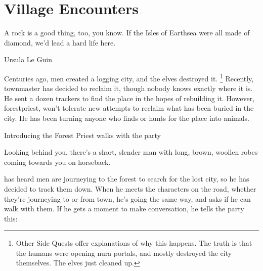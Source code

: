 \section{Village Encounters}


\epigraph{A rock is a good thing, too, you know. If the Isles of Earthsea were all made of diamond, we'd lead a hard life here.}{Ursula Le Guin}

\renewcommand{\sqarea}{Villages}

\setcounter{encnum}{1}
\renewcommand{\encsymbol}{\ding{170}}

\begin{multicols}{2}

\resumecontents[Town]
\resumecontents[Forest]

\label{herenofarther}

\stopcontents[Town]
\stopcontents[Forest]

\startcontents[sq]

\sqminitoc

\noindent
Centuries ago, men created a logging city, and the elves destroyed it.%
\footnote{Other Side Quests offer explanations of why this happens.
The truth is that the humans were opening nura portals, and mostly destroyed the city themselves.
The elves just cleaned up.} 
Recently, \gls{townmaster} has decided to reclaim it, though nobody knows exactly where it is.
He sent a dozen trackers to find the place in the hopes of rebuilding it.
However, \gls{forestpriest}, won't tolerate new attempts to reclaim what has been buried in the city.
He has been turning anyone who finds or hunts for the place into animals.

{Introducing the Forest Priest}%
{ walks with the party}%

\begin{boxtext}

	Looking behind you, there's a short, slender man with long, brown, woollen robes coming towards you on horseback.

\end{boxtext}

 has heard men are journeying to the forest to search for the lost city, so he has decided to track them down.
When he meets the characters on the road, whether they're journeying to or from \gls{town}, he's going the same way, and asks if he can walk with them.
If he gets a moment to make conversation, he tells the party this:


\end{multicols}
